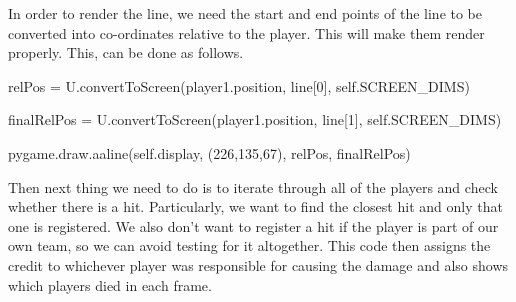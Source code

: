 In order to render the line, we need the start and end points of the line to be converted into co-ordinates relative to the player. This will make them render properly. This, can be done as follows.

\begin{mpy}
                relPos = U.convertToScreen(player1.position, line[0], self.SCREEN_DIMS)

                finalRelPos = U.convertToScreen(player1.position, line[1], self.SCREEN_DIMS)

                pygame.draw.aaline(self.display, (226,135,67), relPos, finalRelPos)
\end{mpy}

Then next thing we need to do is to iterate through all of the players and check whether there is a hit. Particularly, we want to find the closest hit and only that one is registered. We also don't want to register a hit if the player is part of our own team, so we can avoid testing for it altogether. This code then assigns the credit to whichever player was responsible for causing the damage and also shows which players died in each frame.

